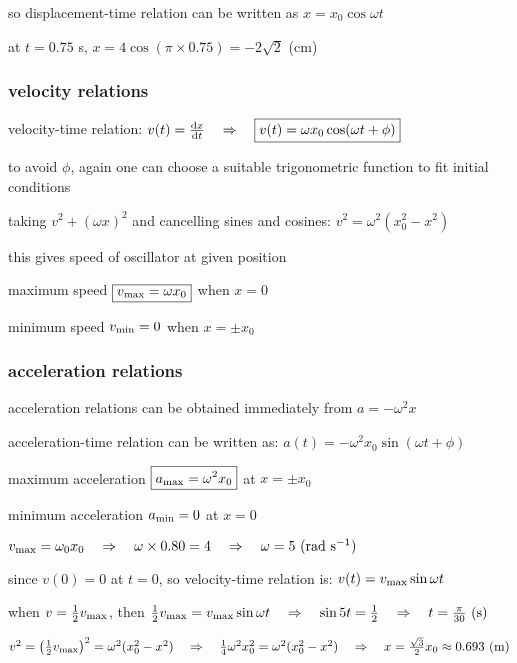so displacement-time relation can be written as $x=x_0 \cos\omega t$

at $t=0.75$ s, $x=4\cos(\pi\times0.75) = -2\sqrt{2}$ (cm) \eoe

\subsubsection{velocity relations}

velocity-time relation: $v(t) = \frac{\mathrm{d}x}{\mathrm{d}t} \quad \Rightarrow \quad \boxed{v(t) = \omega x_0 \cos(\omega t + \phi)}$

to avoid $\phi$, again one can choose a suitable trigonometric function to fit initial conditions

taking $v^2 + (\omega x)^2$ and cancelling sines and cosines: $\boxed{v^2 = \omega^2 (x_0^2 - x^2)}$

this gives speed of oscillator at given position

maximum speed $\boxed{v_{\text{max}} = \omega x_0}$ when $x = 0$

minimum speed $v_{\text{min}} = 0$ when $x = \pm x_0$

\subsubsection{acceleration relations}

acceleration relations can be obtained immediately from $a=-\omega^2 x$

acceleration-time relation can be written as: $a(t) = -\omega^2 x_0 \sin(\omega t + \phi)$

maximum acceleration $\boxed{a_{\text{max}} = \omega^2 x_0}$ at $x=\pm x_0$

minimum acceleration $a_{\text{min}} = 0$ at $x=0$



$v_{\text{max}} = \omega_0 x_0 \quad \Rightarrow \quad \omega \times 0.80 = 4 \quad \Rightarrow \quad \omega = 5 \text{ (rad s$^{-1}$)}$

since $v(0)=0$ at $t=0$, so velocity-time relation is: $v(t) = v_{\text{max}} \sin\omega t$

when $v=\frac{1}{2}v_{\text{max}}$, then $\frac{1}{2}v_{\text{max}} = v_{\text{max}} \sin\omega t \quad \Rightarrow \quad \sin5t = \frac{1}{2} \quad \Rightarrow \quad t=\frac{\pi}{30} \text{ (s)}$

$v^2 = \left(\frac{1}{2}v_{\text{max}}\right)^2 = \omega^2 (x_0^2 - x^2) \quad \Rightarrow \quad \frac{1}{4}\omega^2 x_0^2 = \omega^2 (x_0^2 - x^2) \quad \Rightarrow \quad x = \frac{\sqrt{3}}{2}x_0 \approx 0.693 \text{ (m)}$ \eoe


